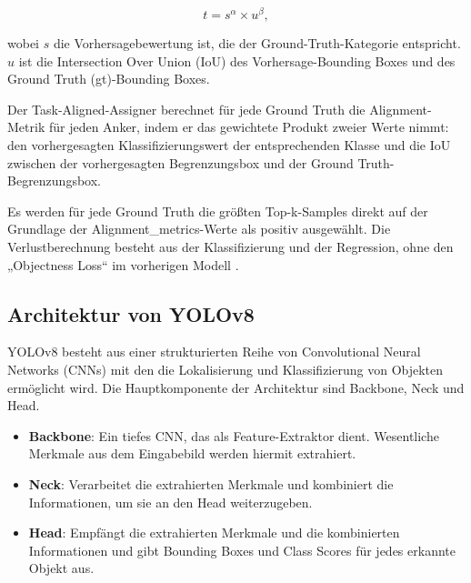 \documentclass[a4paper,12pt]{article}
\begin{document}
\[
t = s^\alpha \times u^\beta,
\]

\noindent wobei $s$ die Vorhersagebewertung ist, die der Ground-Truth-Kategorie entspricht. $u$ ist die Intersection Over Union (IoU) des Vorhersage-Bounding Boxes und des Ground Truth (gt)-Bounding Boxes.

\noindent Der Task-Aligned-Assigner berechnet für jede Ground Truth die Alignment-Metrik für jeden Anker, indem er das gewichtete Produkt zweier Werte nimmt: den vorhergesagten Klassifizierungswert der entsprechenden Klasse und die IoU zwischen der vorhergesagten Begrenzungsbox und der Ground Truth-Begrenzungsbox.

\noindent Es werden für jede Ground Truth die größten Top-k-Samples direkt auf der Grundlage der Alignment\_metrics-Werte als positiv ausgewählt. Die Verlustberechnung besteht aus der Klassifizierung und der Regression, ohne den „Objectness Loss“ im vorherigen Modell \cite{openmmlab2023dive}.


\subsection{Architektur von YOLOv8}
YOLOv8 besteht aus einer strukturierten Reihe von Convolutional Neural Networks (CNNs) mit den die Lokalisierung und Klassifizierung von Objekten ermöglicht wird. Die Hauptkomponente der Architektur sind Backbone, Neck und Head.


\begin{itemize}
    \item \textbf{Backbone}: Ein tiefes CNN, das als Feature-Extraktor dient. Wesentliche Merkmale aus dem Eingabebild werden hiermit extrahiert.
    \item \textbf{Neck}: Verarbeitet die extrahierten Merkmale und kombiniert die Informationen, um sie an den Head weiterzugeben.
    \item \textbf{Head}: Empfängt die extrahierten Merkmale und die kombinierten Informationen und gibt Bounding Boxes und Class Scores für jedes erkannte Objekt aus.
\end{itemize}
\end{document}
